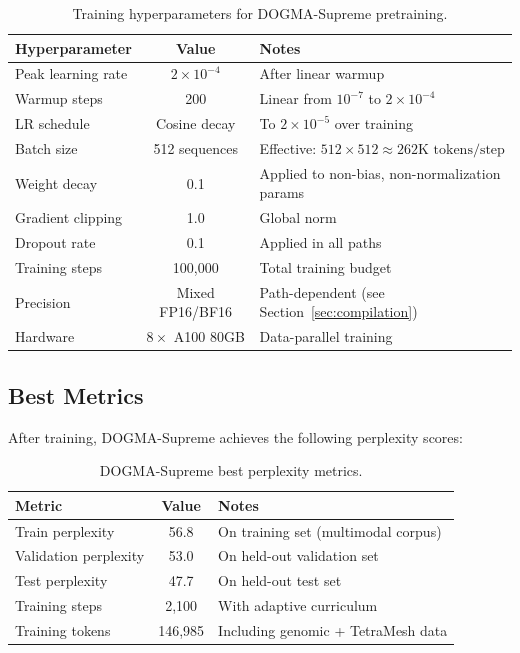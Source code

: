 \begin{table}[H]
\centering
\caption{Training hyperparameters for DOGMA-Supreme pretraining.}
\label{tab:training-hyperparams}
\begin{tabularx}{\textwidth}{L{5cm} c Y}
\toprule
\textbf{Hyperparameter} & \textbf{Value} & \textbf{Notes} \\
\midrule
Peak learning rate & $2 \times 10^{-4}$ & After linear warmup \\
Warmup steps & 200 & Linear from $10^{-7}$ to $2 \times 10^{-4}$ \\
LR schedule & Cosine decay & To $2 \times 10^{-5}$ over training \\
Batch size & 512 sequences & Effective: $512 \times 512 \approx 262\text{K tokens/step}$ \\
Weight decay & 0.1 & Applied to non-bias, non-normalization params \\
Gradient clipping & 1.0 & Global norm \\
Dropout rate & 0.1 & Applied in all paths \citep{srivastava2014} \\
Training steps & 100{,}000 & Total training budget \\
Precision & Mixed FP16/BF16 & Path-dependent (see Section~\ref{sec:compilation}) \\
Hardware & $8 \times$ A100 80GB & Data-parallel training \\
\bottomrule
\end{tabularx}
\end{table}

\subsection{Best Metrics}

After training, DOGMA-Supreme achieves the following perplexity scores:

\begin{table}[H]
\centering
\caption{DOGMA-Supreme best perplexity metrics.}
\label{tab:best-metrics}
\begin{tabularx}{\textwidth}{L{5cm} c Y}
\toprule
\textbf{Metric} & \textbf{Value} & \textbf{Notes} \\
\midrule
Train perplexity & 56.8 & On training set (multimodal corpus) \\
Validation perplexity & 53.0 & On held-out validation set \\
Test perplexity & 47.7 & On held-out test set \\
Training steps & 2{,}100 & With adaptive curriculum \\
Training tokens & 146{,}985 & Including genomic + TetraMesh data \\
\bottomrule
\end{tabularx}
\end{table}

